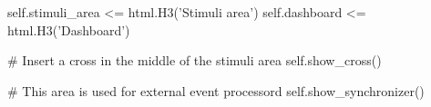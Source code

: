 \begin{python}
self.stimuli_area <= html.H3('Stimuli area')
self.dashboard <= html.H3('Dashboard')

# Insert a cross in the middle of the stimuli area
self.show_cross()

# This area is used for external event processord
self.show_synchronizer()
\end{python}